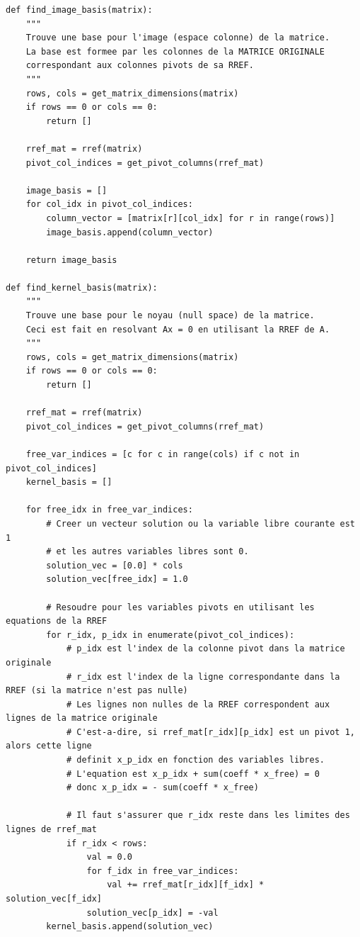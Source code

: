 \documentclass{report}
\begin{document}
\begin{verbatim}
def find_image_basis(matrix):
    """
    Trouve une base pour l'image (espace colonne) de la matrice.
    La base est formee par les colonnes de la MATRICE ORIGINALE
    correspondant aux colonnes pivots de sa RREF.
    """
    rows, cols = get_matrix_dimensions(matrix)
    if rows == 0 or cols == 0:
        return []

    rref_mat = rref(matrix)
    pivot_col_indices = get_pivot_columns(rref_mat)

    image_basis = []
    for col_idx in pivot_col_indices:
        column_vector = [matrix[r][col_idx] for r in range(rows)]
        image_basis.append(column_vector)

    return image_basis

def find_kernel_basis(matrix):
    """
    Trouve une base pour le noyau (null space) de la matrice.
    Ceci est fait en resolvant Ax = 0 en utilisant la RREF de A.
    """
    rows, cols = get_matrix_dimensions(matrix)
    if rows == 0 or cols == 0:
        return []

    rref_mat = rref(matrix)
    pivot_col_indices = get_pivot_columns(rref_mat)

    free_var_indices = [c for c in range(cols) if c not in pivot_col_indices]
    kernel_basis = []

    for free_idx in free_var_indices:
        # Creer un vecteur solution ou la variable libre courante est 1
        # et les autres variables libres sont 0.
        solution_vec = [0.0] * cols
        solution_vec[free_idx] = 1.0

        # Resoudre pour les variables pivots en utilisant les equations de la RREF
        for r_idx, p_idx in enumerate(pivot_col_indices):
            # p_idx est l'index de la colonne pivot dans la matrice originale
            # r_idx est l'index de la ligne correspondante dans la RREF (si la matrice n'est pas nulle)
            # Les lignes non nulles de la RREF correspondent aux lignes de la matrice originale
            # C'est-a-dire, si rref_mat[r_idx][p_idx] est un pivot 1, alors cette ligne
            # definit x_p_idx en fonction des variables libres.
            # L'equation est x_p_idx + sum(coeff * x_free) = 0
            # donc x_p_idx = - sum(coeff * x_free)

            # Il faut s'assurer que r_idx reste dans les limites des lignes de rref_mat
            if r_idx < rows:
                val = 0.0
                for f_idx in free_var_indices:
                    val += rref_mat[r_idx][f_idx] * solution_vec[f_idx]
                solution_vec[p_idx] = -val
        kernel_basis.append(solution_vec)


\end{verbatim}
\end{document}
